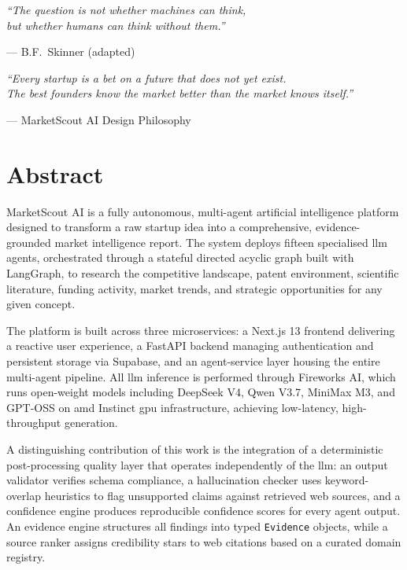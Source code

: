 \documentclass[12pt,a4paper,oneside]{book}
\begin{document}
\newpage
\vspace*{5cm}
\epigraph{%
  \itshape
  ``The question is not whether machines can think,\\
  but whether humans can think without them.''
}{--- B.F.\ Skinner (adapted)}
\vspace{3cm}
\epigraph{%
  \itshape
  ``Every startup is a bet on a future that does not yet exist.\\
  The best founders know the market better than the market knows itself.''
}{--- MarketScout AI Design Philosophy}

\chapter*{Abstract}

MarketScout AI is a fully autonomous, multi-agent artificial intelligence platform designed to transform a raw startup idea into a comprehensive, evidence-grounded market intelligence report. The system deploys fifteen specialised \gls{llm} agents, orchestrated through a stateful directed acyclic graph built with LangGraph, to research the competitive landscape, patent environment, scientific literature, funding activity, market trends, and strategic opportunities for any given concept.

The platform is built across three microservices: a Next.js 13 frontend delivering a reactive user experience, a FastAPI backend managing authentication and persistent storage via Supabase, and an agent-service layer housing the entire multi-agent pipeline. All \gls{llm} inference is performed through Fireworks AI, which runs open-weight models including DeepSeek V4, Qwen V3.7, MiniMax M3, and GPT-OSS on \gls{amd} Instinct \gls{gpu} infrastructure, achieving low-latency, high-throughput generation.

A distinguishing contribution of this work is the integration of a deterministic post-processing quality layer that operates independently of the \gls{llm}: an output validator verifies schema compliance, a hallucination checker uses keyword-overlap heuristics to flag unsupported claims against retrieved web sources, and a confidence engine produces reproducible confidence scores for every agent output. An evidence engine structures all findings into typed \texttt{Evidence} objects, while a source ranker assigns credibility stars to web citations based on a curated domain registry.
\end{document}
